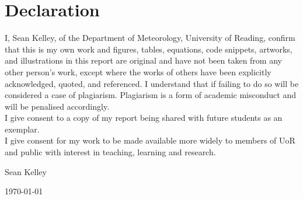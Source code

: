 \thispagestyle{empty}
\chapter*{\Large Declaration}
I, Sean Kelley, of the Department of Meteorology, University of Reading, confirm that this is my own work and figures, tables, equations, code snippets, artworks, and illustrations in this report are original and have not been taken from any other person's work, except where the works of others have been explicitly acknowledged, quoted, and referenced. I understand that if failing to do so will be considered a case of plagiarism. Plagiarism is a form of academic misconduct and will be penalised accordingly. \\

\noindent
I give consent to a copy of my report being shared with future students as an exemplar. \\

\noindent
I give consent for my work to be made available more widely to members of UoR and public with interest in teaching, learning and research.
~\\[1cm]
\begin{flushright}
Sean Kelley

\today
\end{flushright}